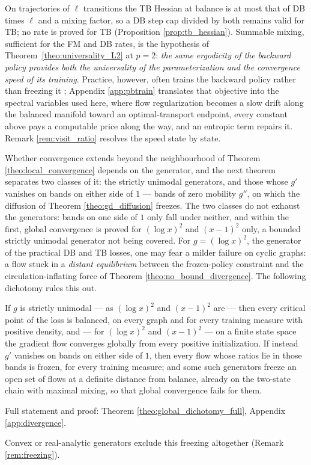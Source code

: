 On trajectories of $\ell$ transitions the TB Hessian at balance is at most that of DB times
$\ell$ and a mixing factor, so a DB step cap divided by both remains valid for TB; no rate is
proved for TB (Proposition \ref{prop:tb_hessian}). Summable mixing, sufficient for the FM
and DB rates, is
the hypothesis of Theorem~\ref{theo:universality_L2} at $p=2$: \emph{the same ergodicity of the backward
policy provides both the universality of the parameterization and the convergence speed of its
training}. Practice, however, often trains the backward policy rather than freezing it
\citep{morozov2025revisiting}; Appendix \ref{app:pbtrain} translates that objective into the
spectral variables used here, where flow regularization becomes a slow drift along the
balanced manifold toward an optimal-transport endpoint, every constant above pays a computable
price along the way, and an entropic term repairs it. Remark \ref{rem:visit_ratio} resolves the speed state by state.

Whether convergence extends beyond the neighbourhood of Theorem \ref{theo:local_convergence} depends on the generator, and the next theorem separates two classes of it: the strictly unimodal generators, and those whose $g'$ vanishes on bands on either side of $1$ --- bands of zero mobility $g''$, on which the diffusion of Theorem \ref{theo:gd_diffusion} freezes. The two classes do not exhaust the generators: bands on one side of $1$ only fall under neither, and within the first, global convergence is proved for $(\log x)^2$ and $(x-1)^2$ only, a bounded strictly unimodal generator not being covered. For $g=(\log x)^2$, the generator of the practical DB and TB losses, one may fear a milder failure on cyclic graphs: a flow stuck in a \emph{distant equilibrium} between the frozen-policy constraint and the circulation-inflating force of Theorem \ref{theo:no_bound_divergence}. The following dichotomy rules this out.

\begin{theorem}\label{theo:global_dichotomy}
If $g$ is strictly unimodal --- as $(\log x)^2$ and $(x-1)^2$ are --- then every critical point
of the loss is balanced, on every graph and for every training measure with positive density,
and --- for $(\log x)^2$ and $(x-1)^2$ --- on a finite state space the gradient flow
converges globally from every positive initialization. If instead
$g'$ vanishes on bands on either side of $1$, then every flow whose ratios lie in those bands
is frozen, for every training measure; and some such generators freeze an open set of flows
at a definite distance from balance, already on the two-state chain with maximal mixing, so
that global convergence fails for them.
\end{theorem}
Full statement and proof: Theorem \ref{theo:global_dichotomy_full}, Appendix
\ref{app:divergence}.

Convex or real-analytic generators exclude this freezing altogether (Remark
\ref{rem:freezing}).

